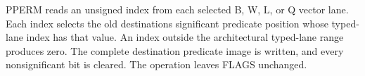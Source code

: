 PPERM reads an unsigned index from each selected B, W, L, or Q vector lane.
Each index selects the old destination\textquotesingle{}s significant predicate position whose
typed-lane index has that value.
An index outside the architectural typed-lane range produces zero.
The complete destination predicate image is written, and every nonsignificant bit is cleared.
The operation leaves FLAGS unchanged.
